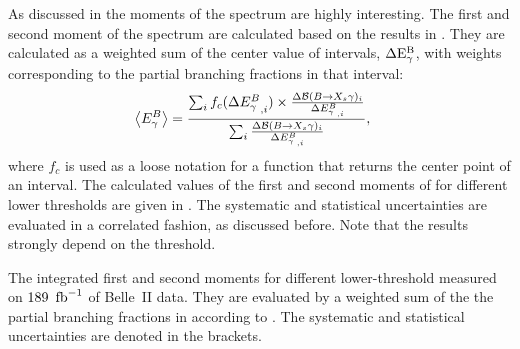 As discussed in  the moments of the \BtoXsgamma
spectrum are highly interesting.
The first and second moment of the \BtoXsgamma spectrum are calculated based on the results in .
They are calculated as a weighted sum of the center value of \EB intervals, $\mathrm{\Delta{\ensuremath{E^B_{\gamma}}}}$,
with weights corresponding to the partial branching fractions in that \EB interval:
\begin{align}\label{eq:weighted_sum_moments}
    \begin{split}
        \expval{\EB} &= \frac{\sum_i f_c(\Delta\EB^{}_{,i})\times  
                               \frac{\Delta\mathcal{B}(\BtoXsgamma)_i}
                                    {\Delta {E^B_{\g}}_{,i}}}
                             {\sum_i \frac{\Delta\mathcal{B}(\BtoXsgamma)_i}{\Delta {E^B_{\g}}_{,i}}},
    \end{split}
\end{align} 
where $f_c$ is used as a loose notation for a function that returns the center point of an interval.
The calculated values of the first and second moments of \EB for different lower thresholds are given in .
The systematic and statistical uncertainties are evaluated in a correlated fashion, as discussed before.
Note that the results strongly depend on the threshold.

\begin{table}[htbp!]
    \centering
    \caption{\label{tab:moments}
    The integrated \BtoXsgamma first and second moments for different lower-\EB threshold measured on $189~\mbox{\,fb}^{-1}$ of Belle~II data.
    They are evaluated by a weighted sum of the the partial branching fractions in  according to .
    The systematic and statistical uncertainties are denoted in the brackets.
    }
    
\end{table}
